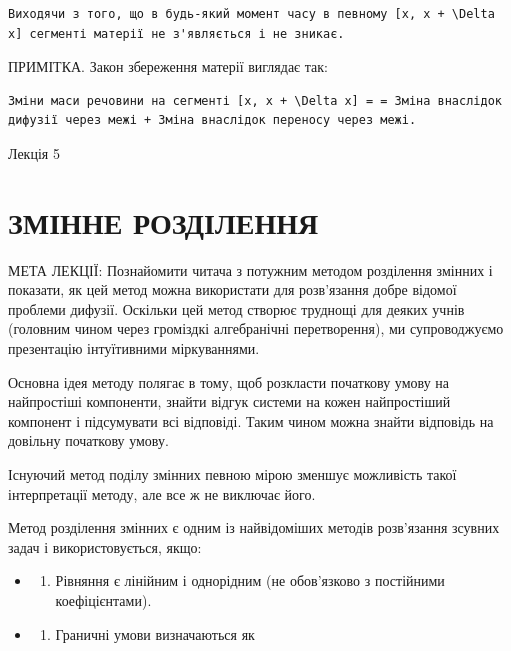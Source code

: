 \documentclass[
  ukrainian,
]{article}
\providecommand{\tightlist}{%
  \setlength{\itemsep}{0pt}\setlength{\parskip}{0pt}}
\begin{document}
\begin{verbatim}
Виходячи з того, що в будь-який момент часу в певному [x, x + \Delta x] сегменті матерії не з'являється і не зникає.
\end{verbatim}

ПРИМІТКА. Закон збереження матерії виглядає так:

\begin{verbatim}
Зміни маси речовини на сегменті [x, x + \Delta x] = = Зміна внаслідок дифузії через межі + Зміна внаслідок переносу через межі.
\end{verbatim}

Лекція 5

\section{ЗМІННЕ
РОЗДІЛЕННЯ}\label{ux437ux43cux456ux43dux43dux435-ux440ux43eux437ux434ux456ux43bux435ux43dux43dux44f}

МЕТА ЛЕКЦІЇ: Познайомити читача з потужним методом розділення змінних і
показати, як цей метод можна використати для розв'язання добре відомої
проблеми дифузії. Оскільки цей метод створює труднощі для деяких учнів
(головним чином через громіздкі алгебранічні перетворення), ми
супроводжуємо презентацію інтуїтивними міркуваннями.

Основна ідея методу полягає в тому, щоб розкласти початкову умову на
найпростіші компоненти, знайти відгук системи на кожен найпростіший
компонент і підсумувати всі відповіді. Таким чином можна знайти
відповідь на довільну початкову умову.

Існуючий метод поділу змінних певною мірою зменшує можливість такої
інтерпретації методу, але все ж не виключає його.

Метод розділення змінних є одним із найвідоміших методів розв'язання
зсувних задач і використовується, якщо:

\begin{itemize}
\tightlist
\item
  \begin{enumerate}
  \def\labelenumi{\arabic{enumi}.}
  \tightlist
  \item
    Рівняння є лінійним і однорідним (не обов'язково з постійними
    коефіцієнтами).
  \end{enumerate}
\item
  \begin{enumerate}
  \def\labelenumi{\arabic{enumi}.}
  \setcounter{enumi}{1}
  \tightlist
  \item
    Граничні умови визначаються як
  \end{enumerate}
\end{itemize}
\end{document}
